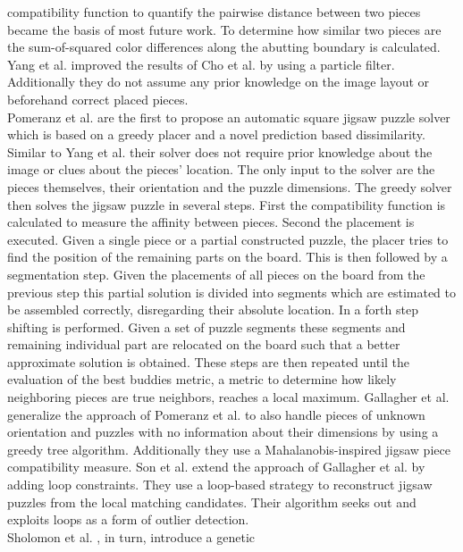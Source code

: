 \documentclass[]{report}
\begin{document}
compatibility function to quantify the pairwise distance between two pieces
became the basis of most future work. To determine how similar two pieces are
the sum-of-squared color differences along the abutting boundary is calculated.
Yang et al. \cite{yang2011particle} improved the results of Cho et al.
\cite{Cho2010} by using a particle filter. Additionally they do not assume any
prior knowledge on the image layout or beforehand correct placed pieces. \\
Pomeranz et al. \cite{Pomeranz2011} are the first to propose an automatic square
jigsaw puzzle solver which is based on a greedy placer and a novel prediction
based dissimilarity. Similar to Yang et al. \cite{yang2011particle} their solver
does not require prior knowledge about the image or clues about the pieces'
location. The only input to the solver are the pieces themselves, their
orientation and the puzzle dimensions. The greedy solver then solves the jigsaw
puzzle in several steps. First the compatibility function is calculated to
measure the affinity between pieces. Second the placement is executed. Given a
single piece or a partial constructed puzzle, the placer tries to find the
position of the remaining parts on the board. This is then followed by a
segmentation step. Given the placements of all pieces on the board from the
previous step this partial solution is divided into segments which are estimated
to be assembled correctly, disregarding their absolute location. In a forth step
shifting is performed. Given a set of puzzle segments these segments and
remaining individual part are relocated on the board such that a better
approximate solution is obtained. These steps are then repeated until the
evaluation of the best buddies metric, a metric to determine how likely
neighboring pieces are true neighbors, reaches a local maximum. Gallagher et al.
\cite{gallagher2012jigsaw} generalize the approach of Pomeranz et al.
\cite{Pomeranz2011} to also handle pieces of unknown orientation and puzzles
with no information about their dimensions by using a greedy tree algorithm.
Additionally they use a Mahalanobis-inspired jigsaw piece compatibility measure.
Son et al. \cite{son2014solving} extend the approach of Gallagher et al.
\cite{gallagher2012jigsaw} by adding loop constraints. They use a loop-based
strategy to reconstruct jigsaw puzzles from the local matching candidates. Their
algorithm seeks out and exploits loops as a form of outlier detection. 
\\
Sholomon et al. \cite{sholomon2013genetic}, in turn, introduce a genetic
\end{document}
